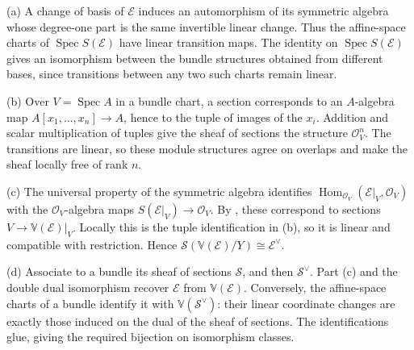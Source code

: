 (a) A change of basis of $\mathcal E$ induces an automorphism of its symmetric algebra whose degree-one part is the same invertible linear change. Thus the affine-space charts of $\operatorname{Spec}S(\mathcal E)$ have linear transition maps. The identity on $\operatorname{Spec}S(\mathcal E)$ gives an isomorphism between the bundle structures obtained from different bases, since transitions between any two such charts remain linear.

(b) Over $V=\operatorname{Spec}A$ in a bundle chart, a section corresponds to an $A$-algebra map $A[x_1,\ldots,x_n]\to A$, hence to the tuple of images of the $x_i$. Addition and scalar multiplication of tuples give the sheaf of sections the structure $\mathcal O_V^n$. The transitions are linear, so these module structures agree on overlaps and make the sheaf locally free of rank $n$.

(c) The universal property of the symmetric algebra identifies $\operatorname{Hom}_{\mathcal O_V}(\mathcal E|_V,\mathcal O_V)$ with the $\mathcal O_V$-algebra maps $S(\mathcal E|_V)\to\mathcal O_V$. By , these correspond to sections $V\to\mathbb V(\mathcal E)|_V$. Locally this is the tuple identification in (b), so it is linear and compatible with restriction. Hence $\mathcal S(\mathbb V(\mathcal E)/Y)\cong\mathcal E^\vee$.

(d) Associate to a bundle its sheaf of sections $\mathcal S$, and then $\mathcal S^\vee$. Part (c) and the double dual isomorphism recover $\mathcal E$ from $\mathbb V(\mathcal E)$. Conversely, the affine-space charts of a bundle identify it with $\mathbb V(\mathcal S^\vee)$: their linear coordinate changes are exactly those induced on the dual of the sheaf of sections. The identifications glue, giving the required bijection on isomorphism classes.
